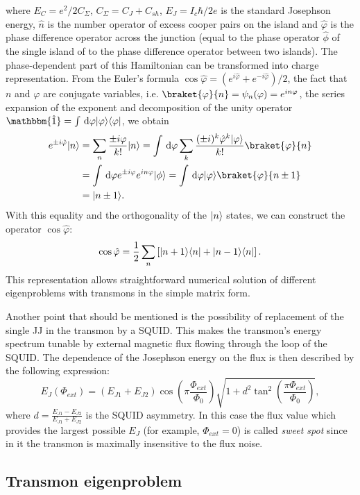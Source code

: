 \documentclass[12pt, twoside]{report}
\newcommand{\diff}{\,\mathrm{d}}
\DeclarePairedDelimiter\bra{\langle}{\rvert}
\DeclarePairedDelimiter\ket{\lvert}{\rangle}
\newcommand{\rbrkt}[1]{\left( #1 \right)}
\newcommand{\sbrkt}[1]{\left[ #1 \right]}
\numberwithin{equation}{section}
\begin{document}
where $E_C = e^2/2C_\Sigma$, $C_\Sigma = C_J+C_{sh}$, $E_J = I_c \hbar/2e$ is the standard Josephson energy, $\hat n$ is the number operator of excess cooper pairs on the island and $\hat \varphi$ is the phase difference operator across the junction (equal to the phase operator $\hat \phi$ of the single island of to the phase difference operator between two islands\cite{Devoret1995}). The phase-dependent part of this Hamiltonian can be transformed into charge representation. From the Euler's formula $\cos \hat \varphi = (e^{i\hat\varphi} + e^{-i\hat\varphi})/2$, the fact that $n$ and $\varphi$ are conjugate variables, i.e. $\braket{\varphi}{n} = \psi_n(\varphi) = e^{i n \varphi}$, the series expansion of the exponent and decomposition of the unity operator $\mathbbm{\hat 1} = \int \diff \varphi \ket{\varphi}\bra{\varphi}$, we obtain
\[
\begin{aligned}
e^{\pm i \hat \varphi}\ket{n} &= \sum_n \frac{\pm i\varphi}{k!}\ket{n} = \int \diff \varphi \sum_k \frac{(\pm i)^k \hat\varphi^k \ket{\varphi}}{k!}\braket{\varphi}{n}\\
&=  \int \diff \varphi e^{\pm i\varphi} e^{i n \varphi} \ket{\phi} = \int \diff \varphi \ket{\varphi}\braket{\varphi}{n\pm1}\\
&= \ket{n\pm1}.
\end{aligned}
\]
With this equality and the orthogonality of the $\ket{n}$ states, we can construct the operator $\cos\hat\varphi$:
\[
\cos\hat\varphi = \frac{1}{2}\sum_n\sbrkt{\ket{n+1}\bra{n} + \ket{n-1}\bra{n}}.
\]
This representation allows straightforward numerical solution of different eigenproblems with transmons in the simple matrix form.

Another point that should be mentioned is the possibility of replacement of the single JJ in the transmon by a SQUID. This makes the transmon's energy spectrum tunable by external magnetic flux flowing through the loop of the SQUID. The dependence of the Josephson energy on the flux is then described by the following expression\cite{Koch2007}:
\[
E_J(\Phi_{ext}) = (E_{J1} + E_{J2})\cos\rbrkt{\pi\frac{\Phi_{ext}}{\Phi_0}}\sqrt{1+d^2\tan^2\rbrkt{\frac{\pi\Phi_{ext}}{\Phi_0}}},
\]
where $d = \frac{E_{J1} - E_{J2}}{E_{J1} + E_{J2}}$ is the SQUID asymmetry. In this case the flux value which provides the largest possible $E_J$ (for example, $\Phi_{ext} = 0$) is called \textit{sweet spot} since in it the transmon is maximally insensitive to the flux noise.


\subsection{Transmon eigenproblem}
\end{document}
